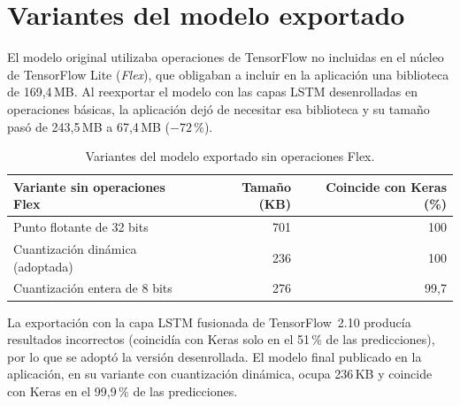 \section{Variantes del modelo exportado}
\label{sec:res-variantes}

El modelo original utilizaba operaciones de TensorFlow no incluidas en el núcleo de TensorFlow Lite (\emph{Flex}), que obligaban a incluir en la aplicación una biblioteca de 169,4\,MB. Al reexportar el modelo con las capas LSTM desenrolladas en operaciones básicas, la aplicación dejó de necesitar esa biblioteca y su tamaño pasó de 243,5\,MB a 67,4\,MB ($-72$\,\%).

\begin{table}[h]
    \centering
    \begin{tabular}{lrr}
        \toprule
        Variante sin operaciones Flex & Tamaño (KB) & Coincide con Keras (\%) \\
        \midrule
        Punto flotante de 32 bits & 701 & 100 \\
        Cuantización dinámica (adoptada) & 236 & 100 \\
        Cuantización entera de 8 bits & 276 & 99,7 \\
        \bottomrule
    \end{tabular}
    \caption{Variantes del modelo exportado sin operaciones Flex.}
    \label{tab:variantes}
\end{table}

La exportación con la capa LSTM fusionada de TensorFlow~2.10 producía resultados incorrectos (coincidía con Keras solo en el 51\,\% de las predicciones), por lo que se adoptó la versión desenrollada. El modelo final publicado en la aplicación, en su variante con cuantización dinámica, ocupa 236\,KB y coincide con Keras en el 99,9\,\% de las predicciones.
